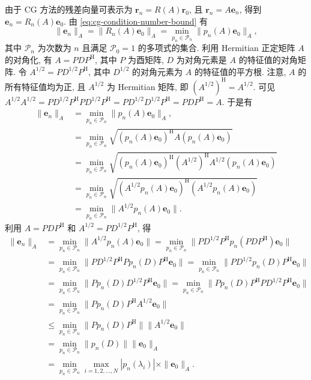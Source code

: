 \begin{Proof}
{由于 CG 方法的残差向量可表示为 $\bm r_n=R(A)\bm r_0$, 且 $\bm r_n=A\bm e_n$, 得到 $\bm e_n=R_n(A)\bm e_0$. 由 \eqref{eq:cg-condition-number-bound} 有}
\[\|\bm e_n\|_A=\|R_n(A)\bm e_0\|_A=\min_{p_n\in\mathcal P_n}\|p_n(A)\bm e_0\|_A,\]
{其中 $\mathcal P_n$ 为次数为 $n$ 且满足 $\mathcal P_0=1$ 的多项式的集合. 利用 Hermitian 正定矩阵 $A$ 的对角化, 有 $A=PDP^{\mathrm H}$, 其中 $P$ 为酉矩阵, $D$ 为对角元素是 $A$ 的特征值的对角矩阵. 令 $A^{1/2}=PD^{1/2}P^{\mathrm H}$, 其中 $D^{1/2}$ 的对角元素为 $A$ 的特征值的平方根. 注意, $A$ 的所有特征值均为正, 且 $A^{1/2}$ 为 Hermitian 矩阵, 即 $(A^{1/2})^{\mathrm H}=A^{1/2}$. 可见 $A^{1/2}A^{1/2}=PD^{1/2}P^{\mathrm H}PD^{1/2}P^{\mathrm H}=PD^{1/2}D^{1/2}P^{\mathrm H}=PDP^{\mathrm H}=A$. 于是有}
\[\begin{aligned}
\|\bm e_n\|_A&=\min_{p_n\in\mathcal P_n}\|p_n(A)\bm e_0\|_A,\\
&=\min_{p_n\in\mathcal P_n}\sqrt{(p_n(A)\bm e_0)^{\mathrm H}A(p_n(A)\bm e_0)}\\
&=\min_{p_n\in\mathcal P_n}\sqrt{(p_n(A)\bm e_0)^{\mathrm H}(A^{1/2})^{\mathrm H}A^{1/2}(p_n(A)\bm e_0)}\\
&=\min_{p_n\in\mathcal P_n}\sqrt{(A^{1/2}p_n(A)\bm e_0)^{\mathrm H}(A^{1/2}p_n(A)\bm e_0)}\\
&=\min_{p_n\in\mathcal P_n}\|A^{1/2}p_n(A)\bm e_0\|.
\end{aligned}\]
{利用 $A=PDP^{\mathrm H}$ 和 $A^{1/2}=PD^{1/2}P^{\mathrm H}$, 得}
\[\begin{aligned}
\|\bm e_n\|_A&=\min_{p_n\in\mathcal P_n}\|A^{1/2}p_n(A)\bm e_0\|=\min_{p_n\in\mathcal P_n}\|PD^{1/2}P^{\mathrm H}p_n(PDP^{\mathrm H})\bm e_0\|\\
&=\min_{p_n\in\mathcal P_n}\|PD^{1/2}P^{\mathrm H}Pp_n(D)P^{\mathrm H}\bm e_0\|
=\min_{p_n\in\mathcal P_n}\|PD^{1/2}p_n(D)P^{\mathrm H}\bm e_0\|\\
&=\min_{p_n\in\mathcal P_n}\|Pp_n(D)D^{1/2}P^{\mathrm H}\bm e_0\|
=\min_{p_n\in\mathcal P_n}\|Pp_n(D)P^{\mathrm H}PD^{1/2}P^{\mathrm H}\bm e_0\|\\
&=\min_{p_n\in\mathcal P_n}\|Pp_n(D)P^{\mathrm H}A^{1/2}\bm e_0\|\\
&\le\min_{p_n\in\mathcal P_n}\|Pp_n(D)P^{\mathrm H}\|\|A^{1/2}\bm e_0\|\\
&=\min_{p_n\in\mathcal P_n}\|p_n(D)\|\|\bm e_0\|_A\\
&=\min_{p_n\in\mathcal P_n}\max_{i=1,2,\ldots,N}|p_n(\lambda_i)|\times\|\bm e_0\|_A.

\end{aligned}\]
\end{Proof}
